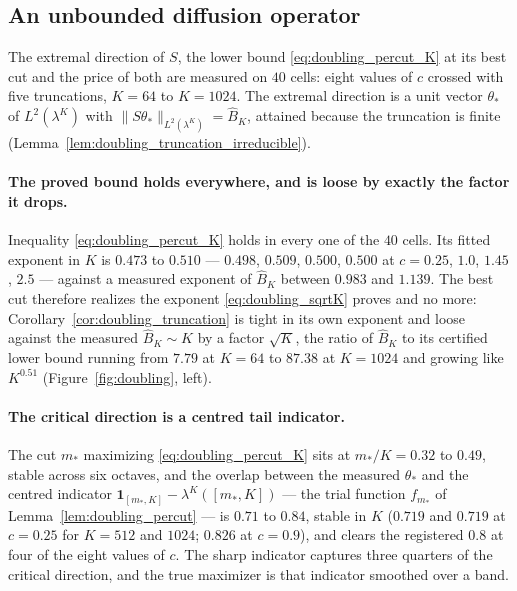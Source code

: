 \subsection{An unbounded diffusion operator}\label{sec:doubling_cost}

The extremal direction of $S$, the lower bound \eqref{eq:doubling_percut_K} at its best cut and
the price of both are measured on $40$ cells: eight values of $c$ crossed with five
truncations, $K=64$ to $K=1024$. The extremal direction is a unit vector $\theta_*$ of
$L^2(\lambda^K)$ with $\|S\theta_*\|_{L^2(\lambda^K)}=\widehat B_K$, attained because the
truncation is finite (Lemma~\ref{lem:doubling_truncation_irreducible}).

\paragraph{The proved bound holds everywhere, and is loose by exactly the factor it drops.}
Inequality \eqref{eq:doubling_percut_K} holds in every one of the $40$ cells. Its fitted
exponent in $K$ is $0.473$ to $0.510$ --- $0.498$, $0.509$, $0.500$, $0.500$ at $c=0.25$,
$1.0$, $1.45$, $2.5$ --- against a measured exponent of $\widehat B_K$ between $0.983$ and
$1.139$. The best cut therefore realizes the exponent \eqref{eq:doubling_sqrtK} proves and no
more: Corollary~\ref{cor:doubling_truncation} is tight in its own exponent and loose against
the measured $\widehat B_K\sim K$ by a factor $\sqrt K$, the ratio of $\widehat B_K$ to its
certified lower bound running from $7.79$ at $K=64$ to $87.38$ at $K=1024$ and growing like
$K^{0.51}$ (Figure~\ref{fig:doubling}, left).

\paragraph{The critical direction is a centred tail indicator.}
The cut $m_*$ maximizing \eqref{eq:doubling_percut_K} sits at $m_*/K=0.32$ to $0.49$, stable
across six octaves, and the overlap between the measured $\theta_*$ and the centred
indicator $\mathbf 1_{[m_*,K]}-\lambda^K([m_*,K])$ --- the trial function $f_{m_*}$ of
Lemma~\ref{lem:doubling_percut} --- is
$0.71$ to $0.84$, stable in $K$ ($0.719$ and $0.719$ at $c=0.25$ for $K=512$ and $1024$;
$0.826$ at $c=0.9$), and clears the registered $0.8$ at four of the eight values of $c$. The
sharp indicator captures three quarters of the critical direction, and the true maximizer is
that indicator smoothed over a band.

